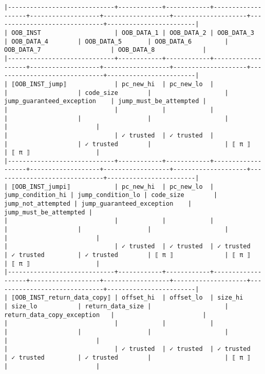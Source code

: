 \documentclass[varwidth=\maxdimen,margin=0.5cm,multi={verbatim}]{standalone}
\begin{document}
\begin{verbatim}
|-----------------------------+------------+------------+-------------------+-------------------+------------------+--------------------+------------------------------+------------------------|
| OOB_INST                    | OOB_DATA_1 | OOB_DATA_2 | OOB_DATA_3        | OOB_DATA_4        | OOB_DATA_5       | OOB_DATA_6         | OOB_DATA_7                   | OOB_DATA_8             |
|-----------------------------+------------+------------+-------------------+-------------------+------------------+--------------------+------------------------------+------------------------|
| ⟦OOB_INST_jump⟧             | pc_new_hi  | pc_new_lo  |                   |                   | code_size        |                    | jump_guaranteed_exception    | jump_must_be_attempted |
|                             |            |            |                   |                   |                  |                    |                              |                        |
|                             | ✓ trusted  | ✓ trusted  |                   |                   | ✓ trusted        |                    | ⟦ π ⟧                        | ⟦ π ⟧                  |
|-----------------------------+------------+------------+-------------------+-------------------+------------------+--------------------+------------------------------+------------------------|
| ⟦OOB_INST_jumpi⟧            | pc_new_hi  | pc_new_lo  | jump_condition_hi | jump_condition_lo | code_size        | jump_not_attempted | jump_guaranteed_exception    | jump_must_be_attempted |
|                             |            |            |                   |                   |                  |                    |                              |                        |
|                             | ✓ trusted  | ✓ trusted  | ✓ trusted         | ✓ trusted         | ✓ trusted        | ⟦ π ⟧              | ⟦ π ⟧                        | ⟦ π ⟧                  |
|-----------------------------+------------+------------+-------------------+-------------------+------------------+--------------------+------------------------------+------------------------|
| ⟦OOB_INST_return_data_copy⟧ | offset_hi  | offset_lo  | size_hi           | size_lo           | return_data_size |                    | return_data_copy_exception   |                        |
|                             |            |            |                   |                   |                  |                    |                              |                        |
|                             | ✓ trusted  | ✓ trusted  | ✓ trusted         | ✓ trusted         | ✓ trusted        |                    | ⟦ π ⟧                        |                        |

\end{verbatim}
\end{document}
